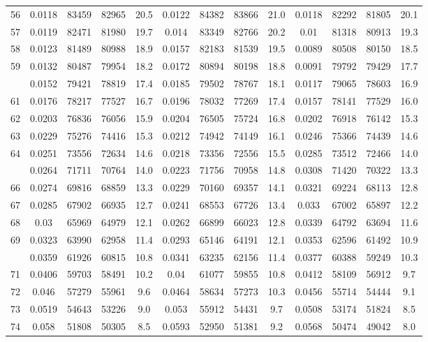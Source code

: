\documentclass[
  14pt,
]{article}
\begin{document}
\begin{longtable}[t]{lcccccccccccc}
56 & 0.0118 & 83459 & 82965 & 20.5 & 0.0122 & 84382 & 83866 & 21.0 & 0.0118 & 82292 & 81805 & 20.1\\
57 & 0.0119 & 82471 & 81980 & 19.7 & 0.014 & 83349 & 82766 & 20.2 & 0.01 & 81318 & 80913 & 19.3\\
58 & 0.0123 & 81489 & 80988 & 18.9 & 0.0157 & 82183 & 81539 & 19.5 & 0.0089 & 80508 & 80150 & 18.5\\
59 & 0.0132 & 80487 & 79954 & 18.2 & 0.0172 & 80894 & 80198 & 18.8 & 0.0091 & 79792 & 79429 & 17.7\\
\addlinespace
60 & 0.0152 & 79421 & 78819 & 17.4 & 0.0185 & 79502 & 78767 & 18.1 & 0.0117 & 79065 & 78603 & 16.9\\
61 & 0.0176 & 78217 & 77527 & 16.7 & 0.0196 & 78032 & 77269 & 17.4 & 0.0157 & 78141 & 77529 & 16.0\\
62 & 0.0203 & 76836 & 76056 & 15.9 & 0.0204 & 76505 & 75724 & 16.8 & 0.0202 & 76918 & 76142 & 15.3\\
63 & 0.0229 & 75276 & 74416 & 15.3 & 0.0212 & 74942 & 74149 & 16.1 & 0.0246 & 75366 & 74439 & 14.6\\
64 & 0.0251 & 73556 & 72634 & 14.6 & 0.0218 & 73356 & 72556 & 15.5 & 0.0285 & 73512 & 72466 & 14.0\\
\addlinespace
65 & 0.0264 & 71711 & 70764 & 14.0 & 0.0223 & 71756 & 70958 & 14.8 & 0.0308 & 71420 & 70322 & 13.3\\
66 & 0.0274 & 69816 & 68859 & 13.3 & 0.0229 & 70160 & 69357 & 14.1 & 0.0321 & 69224 & 68113 & 12.8\\
67 & 0.0285 & 67902 & 66935 & 12.7 & 0.0241 & 68553 & 67726 & 13.4 & 0.033 & 67002 & 65897 & 12.2\\
68 & 0.03 & 65969 & 64979 & 12.1 & 0.0262 & 66899 & 66023 & 12.8 & 0.0339 & 64792 & 63694 & 11.6\\
69 & 0.0323 & 63990 & 62958 & 11.4 & 0.0293 & 65146 & 64191 & 12.1 & 0.0353 & 62596 & 61492 & 10.9\\
\addlinespace
70 & 0.0359 & 61926 & 60815 & 10.8 & 0.0341 & 63235 & 62156 & 11.4 & 0.0377 & 60388 & 59249 & 10.3\\
71 & 0.0406 & 59703 & 58491 & 10.2 & 0.04 & 61077 & 59855 & 10.8 & 0.0412 & 58109 & 56912 & 9.7\\
72 & 0.046 & 57279 & 55961 & 9.6 & 0.0464 & 58634 & 57273 & 10.3 & 0.0456 & 55714 & 54444 & 9.1\\
73 & 0.0519 & 54643 & 53226 & 9.0 & 0.053 & 55912 & 54431 & 9.7 & 0.0508 & 53174 & 51824 & 8.5\\
74 & 0.058 & 51808 & 50305 & 8.5 & 0.0593 & 52950 & 51381 & 9.2 & 0.0568 & 50474 & 49042 & 8.0\\

\end{longtable}
\end{document}
